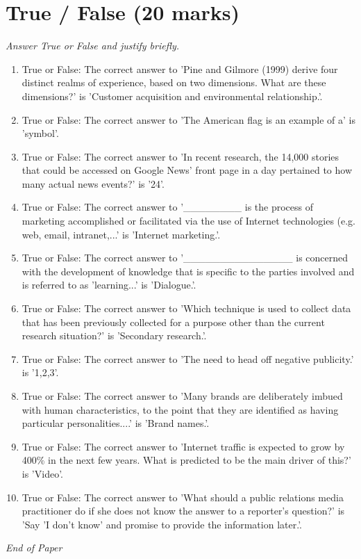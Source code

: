 \documentclass[12pt]{article}
\begin{document}
\section*{True / False (20 marks)}
\textit{Answer True or False and justify briefly.}
\begin{enumerate}[label=\arabic*.]
\item True or False: The correct answer to 'Pine and Gilmore (1999) derive four distinct realms of experience, based on two dimensions. What are these dimensions?' is 'Customer acquisition and environmental relationship.'.
\item True or False: The correct answer to 'The American flag is an example of a' is 'symbol'.
\item True or False: The correct answer to 'In recent research, the 14,000 stories that could be accessed on Google News' front page in a day pertained to how many actual news events?' is '24'.
\item True or False: The correct answer to '\_\_\_\_\_\_\_\_ is the process of marketing accomplished or facilitated via the use of Internet technologies (e.g. web, email, intranet,...' is 'Internet marketing.'.
\item True or False: The correct answer to '\_\_\_\_\_\_\_\_\_\_\_\_\_\_\_ is concerned with the development of knowledge that is specific to the parties involved and is referred to as 'learning...' is 'Dialogue.'.
\item True or False: The correct answer to 'Which technique is used to collect data that has been previously collected for a purpose other than the current research situation?' is 'Secondary research.'.
\item True or False: The correct answer to 'The need to head off negative publicity.' is '1,2,3'.
\item True or False: The correct answer to 'Many brands are deliberately imbued with human characteristics, to the point that they are identified as having particular personalities....' is 'Brand names.'.
\item True or False: The correct answer to 'Internet traffic is expected to grow by 400\% in the next few years. What is predicted to be the main driver of this?' is 'Video'.
\item True or False: The correct answer to 'What should a public relations media practitioner do if she does not know the answer to a reporter's question?' is 'Say 'I don't know' and promise to provide the information later.'.
\end{enumerate}

\vfill
\noindent\textit{End of Paper}
\end{document}
